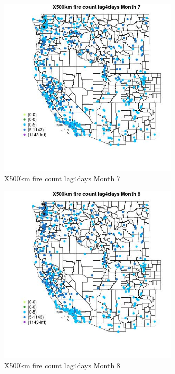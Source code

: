 \begin{figure} 
\centering  
\includegraphics[width=0.77\textwidth]{Code_Outputs/Report_ML_input_PM25_Step4_part_e_de_duplicated_aves_compiled_2019-05-14wNAs_MapObsMo7X500km_fire_count_lag4days.jpg} 
\caption{\label{fig:Report_ML_input_PM25_Step4_part_e_de_duplicated_aves_compiled_2019-05-14wNAsMapObsMo7X500km_fire_count_lag4days}X500km fire count lag4days Month 7} 
\end{figure} 
 

\clearpage 

\begin{figure} 
\centering  
\includegraphics[width=0.77\textwidth]{Code_Outputs/Report_ML_input_PM25_Step4_part_e_de_duplicated_aves_compiled_2019-05-14wNAs_MapObsMo8X500km_fire_count_lag4days.jpg} 
\caption{\label{fig:Report_ML_input_PM25_Step4_part_e_de_duplicated_aves_compiled_2019-05-14wNAsMapObsMo8X500km_fire_count_lag4days}X500km fire count lag4days Month 8} 
\end{figure} 
 

